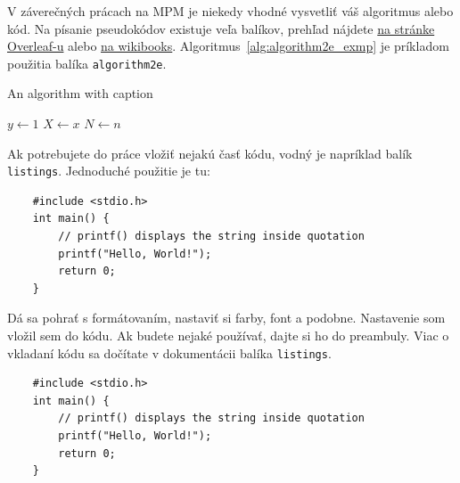 V záverečných prácach na MPM je niekedy vhodné vysvetliť váš algoritmus alebo kód. Na písanie pseudokódov existuje veľa balíkov, prehľad nájdete \href{https://www.overleaf.com/learn/latex/Algorithms}{na stránke Overleaf-u} alebo \href{https://en.wikibooks.org/wiki/LaTeX/Algorithms#The_algorithm_environment}{na wikibooks}. Algoritmus~\ref{alg:algorithm2e_exmp} je príkladom použitia balíka \verb|algorithm2e|.

\begin{algorithm}[h!]
	\caption{An algorithm with caption}\label{alg:algorithm2e_exmp}
	$y \gets 1$\;
	$X \gets x$\;
	$N \gets n$\;
\end{algorithm}

Ak potrebujete do práce vložiť nejakú časť kódu, vodný je napríklad balík \verb|listings|. Jednoduché použitie je tu:
\begin{lstlisting}
	#include <stdio.h>
	int main() {
		// printf() displays the string inside quotation
		printf("Hello, World!");
		return 0;
	}
\end{lstlisting}

Dá sa pohrať s formátovaním, nastaviť si farby, font a podobne. Nastavenie som vložil sem do kódu. Ak budete nejaké používať, dajte si ho do preambuly. Viac o vkladaní kódu sa dočítate v dokumentácii balíka \verb|listings|.



\begin{lstlisting}
	#include <stdio.h>
	int main() {
		// printf() displays the string inside quotation
		printf("Hello, World!");
		return 0;
	}
\end{lstlisting}




